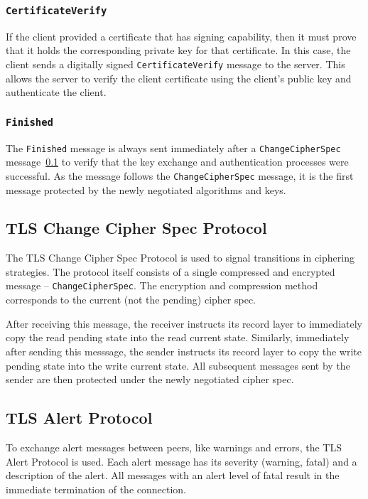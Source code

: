 \subsubsection{\texttt{CertificateVerify}}
    If the client provided a certificate that has signing capability, then it
    must prove that it holds the corresponding private key for that certificate.
    In this case, the client sends a digitally signed \texttt{CertificateVerify}
    message to the server. This allows the server to verify the client certificate
    using the client's public key and authenticate the client.

\subsubsection{\texttt{Finished}}
    The \texttt{Finished} message is always sent immediately after a
    \texttt{ChangeCipherSpec} message~\ref{ref:change_cipher_spec} to verify
    that the key exchange and authentication processes were successful.
    As the message follows the \texttt{ChangeCipherSpec} message, it is the
    first message protected by the newly negotiated algorithms and keys.

\subsection{TLS Change Cipher Spec Protocol} \label{ref:change_cipher_spec}
    The TLS Change Cipher Spec Protocol is used to signal transitions in
    ciphering strategies. The protocol itself consists of a single compressed
    and encrypted message -- \texttt{ChangeCipherSpec}. The encryption and
    compression method corresponds to the current (not the pending) cipher
    spec.

    After receiving this message, the receiver instructs its record layer
    to immediately copy the read pending state into the read current state.
    Similarly, immediately after sending this messsage, the sender instructs
    its record layer to copy the write pending state into the write current
    state. All subsequent messages sent by the sender are then protected under
    the newly negotiated cipher spec.

\subsection{TLS Alert Protocol}
    To exchange alert messages between peers, like warnings and errors, the
    TLS Alert Protocol is used. Each alert message has its severity (warning,
    fatal) and a description of the alert. All messages with an alert level
    of fatal result in the immediate termination of the connection.

